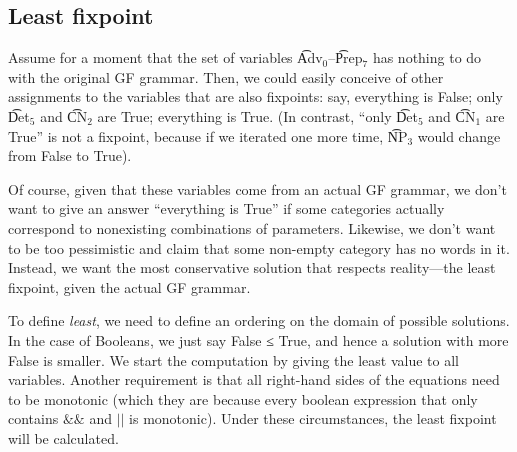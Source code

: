\begin{EmptyItem}
\begin{Highlighting}[]
\OtherTok{::=} \FunctionTok{&&} \FunctionTok{||} \FunctionTok{&&}  \NormalTok{;}
\OtherTok{::=} \FunctionTok{&&} \FunctionTok{||}  \NormalTok{;}
\OtherTok{::=} \FunctionTok{&&}  \NormalTok{;}
\OtherTok{::=} \FunctionTok{&&}  \NormalTok{;}
\OtherTok{::=} \FunctionTok{&&}  \NormalTok{;}
\OtherTok{::=}  \NormalTok{;}
\OtherTok{::=}  \NormalTok{;}
\OtherTok{::=}  \NormalTok{;}
\end{Highlighting}
\end{EmptyItem}

\subsection{Least fixpoint}


Assume for a moment that the set of variables  \t{Adv$_\text{0}$}--\t{Prep$_\text{7}$} has nothing to do with the original GF grammar. Then, we could easily conceive of other assignments to the variables that are also fixpoints: say, everything is False; only \t{Det$_\text{5}$} and \t{CN$_\text{2}$} are True; everything is True. (In contrast, “only \t{Det$_\text{5}$} and \t{CN$_\text{1}$} are True” is not a fixpoint, because if we iterated one more time, \t{NP$_\text{3}$} would change from False to True).

Of course, given that these variables come from an actual GF grammar, we don’t want to give an answer “everything is True” if some categories actually correspond to nonexisting combinations of parameters. Likewise, we don’t want to be too pessimistic and claim that some non-empty category has no words in it. Instead, we want the most conservative solution that respects reality---the least fixpoint, given the actual GF grammar.

To define \emph{least}, we need to define an ordering on the domain of possible solutions. In the case of Booleans, we just say False ≤ True, and hence a solution with more False is smaller. 
We start the computation by giving the least value to all variables.
Another requirement is that all right-hand sides of the equations need to be monotonic (which they are because every boolean expression that only contains $\&\&$ and $||$ is monotonic). Under these circumstances, the least fixpoint will be calculated.

